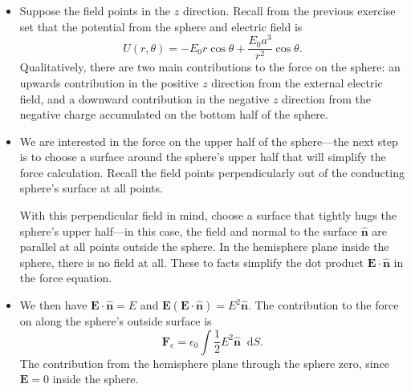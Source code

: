 \documentclass[11pt, a4paper]{article}
\newcommand{\diff}{\mathop{}\!\mathrm{d}} %
\renewcommand{\vec}[1]{\bm{#1}} %
\newcommand{\uvec}[1]{\hat{\vec{#1}}} %
\newcommand{\E}{\vec{E}}  %
\newcommand{\ee}{\epsilon_{0}}  %
\begin{document}
\begin{itemize}
	\item Suppose the field points in the $ z $ direction. Recall from the previous exercise set that the potential from the sphere and electric field is
	\begin{equation*}
		U(r, \theta) = - E_{0}r \cos \theta + \frac{E_{0}a^{3}}{r^{2}}\cos \theta.
	\end{equation*}
	Qualitatively, there are two main contributions to the force on the sphere: an upwards contribution in the positive $ z $ direction from the external electric field, and a downward contribution in the negative $ z $ direction from the negative charge accumulated on the bottom half of the sphere. 
	
	\item We are interested in the force on the upper half of the sphere---the next step is to choose a surface around the sphere's upper half that will simplify the force calculation. Recall the field points perpendicularly out of the conducting sphere's surface at all points. 
	
	With this perpendicular field in mind, choose a surface that tightly hugs the sphere's upper half---in this case, the field and normal to the surface $ \uvec{n} $ are parallel at all points outside the sphere. In the hemisphere plane inside the sphere, there is no field at all. These to facts simplify the dot product $ \E \cdot \uvec{n} $ in the force equation. 
	
	\item We then have $ \E \cdot \uvec{n} = E $ and $ \E( \E \cdot \uvec{n}) = E^{2}\uvec{n} $. The contribution to the force on along the sphere's outside surface is
	\begin{equation*}
		\vec{F}_{e} = \ee \int \frac{1}{2} E^{2} \uvec{n} \diff S.
	\end{equation*}
	The contribution from the hemisphere plane through the sphere zero, since $ \E = 0 $ inside the sphere. 
	

\end{itemize}
\end{document}
